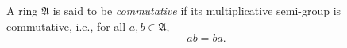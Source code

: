 A ring $\mathfrak{A}$ is said to be \emph{commutative} if its multiplicative semi-group is commutative, i.e., for all $a, b \in \mathfrak{A}$,
$$ab = ba.$$
